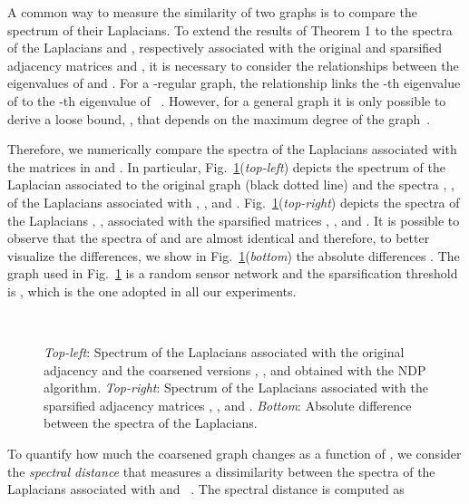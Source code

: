 \documentclass[journal]{IEEEtran}
\begin{document}
A common way to measure the similarity of two graphs is to compare the spectrum of their Laplacians.
To extend the results of Theorem 1 to the spectra of the Laplacians  and , respectively associated with the original and sparsified adjacency matrices  and , it is necessary to consider the relationships between the eigenvalues of  and .
For a -regular graph, the relationship  links the -th eigenvalue  of  to the -th eigenvalue  of ~\cite{lutzeyer2017comparing}.
However, for a general graph it is only possible to derive a loose bound, , that depends on the maximum degree  of the graph~\cite[Lemma 2.21]{zumstein2005comparison}.

Therefore, we numerically compare the spectra of the Laplacians associated with the matrices in  and . 
In particular, Fig.~\ref{fig:spectra_diff}(\textit{top-left}) depicts the spectrum of the Laplacian associated to the original graph  (black dotted line) and the spectra , ,  of the Laplacians associated with , , and .
Fig.~\ref{fig:spectra_diff}(\textit{top-right}) depicts the spectra of the Laplacians , ,  associated with the sparsified matrices , , and .
It is possible to observe that the spectra of  and  are almost identical and therefore, to better visualize the differences, we show in Fig.~\ref{fig:spectra_diff}(\textit{bottom}) the absolute differences .
The graph used in Fig.~\ref{fig:spectra_diff} is a random sensor network and the sparsification threshold is , which is the one adopted in all our experiments.
\begin{figure}[!ht]
    \centering
    \hspace{-.6cm}~

    \caption{
    \textit{Top-left}: Spectrum of the Laplacians associated with the original adjacency  and the coarsened versions , , and  obtained with the NDP algorithm. 
    \textit{Top-right}: Spectrum of the Laplacians associated with the sparsified adjacency matrices , , and .
    \textit{Bottom}: Absolute difference between the spectra of the Laplacians.
    }
    \label{fig:spectra_diff}
\end{figure}

To quantify how much the coarsened graph changes as a function of , we consider the \emph{spectral distance} that measures a dissimilarity between the spectra of the Laplacians associated with  and ~\cite{loukas2019graph}. 
The spectral distance is computed as 
\end{document}
